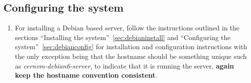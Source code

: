 \subsection{Configuring the system}
\flushleft
\begin{enumerate}
\item 	For installing a Debian based server, follow the instructions outlined in the sections ``Installing the 
		system''~\ref{sec:debianinstall} and ``Configuring the system''~\ref{sec:debianconfig} for installation and configuration 
		instructions with the only exception being that the hostname should be something unique such as \emph{cernvm-debian6-server}, to 
		indicate that it is running the \tapper server, {\bf again keep the hostname convention consistent}.
\end{enumerate}


\newpage
